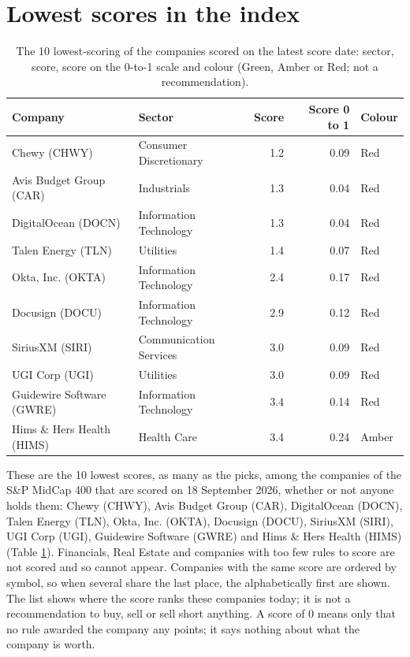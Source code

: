 \documentclass[11pt,a4paper]{article}
\begin{document}
\section{Lowest scores in the index}
\label{sec:worst}
\begin{table}[H]
\centering
\small
\caption{The 10 lowest-scoring of the companies scored on the latest score date: sector, score, score on the 0-to-1 scale and colour (Green, Amber or Red; not a recommendation).}\label{tab:worst}
\begin{tabular}{p{4.4cm} p{3cm} r r p{3cm}}
\hline
Company & Sector & Score & Score 0 to 1 & Colour \\
\hline
Chewy (CHWY) & Consumer Discretionary & 1.2 & 0.09 & \cellcolor[HTML]{F4B6B6}Red \\
Avis Budget Group (CAR) & Industrials & 1.3 & 0.04 & \cellcolor[HTML]{F4B6B6}Red \\
DigitalOcean (DOCN) & Information Technology & 1.3 & 0.04 & \cellcolor[HTML]{F4B6B6}Red \\
Talen Energy (TLN) & Utilities & 1.4 & 0.07 & \cellcolor[HTML]{F4B6B6}Red \\
Okta, Inc. (OKTA) & Information Technology & 2.4 & 0.17 & \cellcolor[HTML]{F4B6B6}Red \\
Docusign (DOCU) & Information Technology & 2.9 & 0.12 & \cellcolor[HTML]{F4B6B6}Red \\
SiriusXM (SIRI) & Communication Services & 3.0 & 0.09 & \cellcolor[HTML]{F4B6B6}Red \\
UGI Corp (UGI) & Utilities & 3.0 & 0.09 & \cellcolor[HTML]{F4B6B6}Red \\
Guidewire Software (GWRE) & Information Technology & 3.4 & 0.14 & \cellcolor[HTML]{F4B6B6}Red \\
Hims \& Hers Health (HIMS) & Health Care & 3.4 & 0.24 & \cellcolor[HTML]{FFEB9C}Amber \\
\hline
\end{tabular}
\end{table}
These are the 10 lowest scores, as many as the picks, among the companies of the S\&P MidCap 400 that are scored on 18 September 2026, whether or not anyone holds them: Chewy (CHWY), Avis Budget Group (CAR), DigitalOcean (DOCN), Talen Energy (TLN), Okta, Inc. (OKTA), Docusign (DOCU), SiriusXM (SIRI), UGI Corp (UGI), Guidewire Software (GWRE) and Hims \& Hers Health (HIMS) (Table \ref{tab:worst}). Financials, Real Estate and companies with too few rules to score are not scored and so cannot appear. Companies with the same score are ordered by symbol, so when several share the last place, the alphabetically first are shown. The list shows where the score ranks these companies today; it is not a recommendation to buy, sell or sell short anything. A score of 0 means only that no rule awarded the company any points; it says nothing about what the company is worth.
\end{document}
